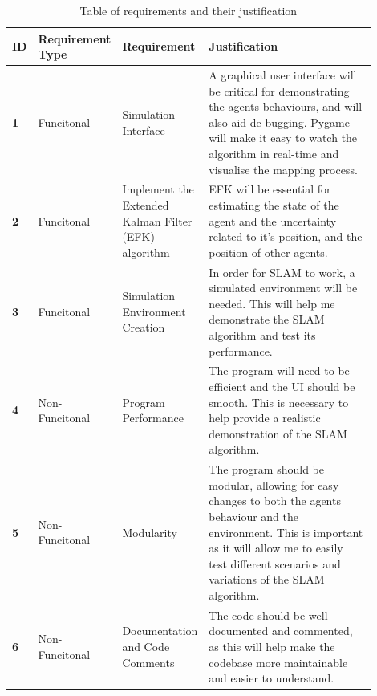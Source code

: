 \documentclass[12pt]{article}
\begin{document}
\begin{table}[H]
    \centering
    \begin{tabular}{|p{0.03\linewidth}|p{0.17\linewidth}|p{0.17\linewidth}|p{0.53\linewidth}|}
        \hline
        \textbf{ID} &
        \textbf{Requirement Type} &
        \textbf{Requirement} &
        \textbf{Justification}\\
        \hline
        \textbf{1} &
        Funcitonal &
        Simulation Interface &
        A graphical user interface will be critical for demonstrating the agents behaviours, and will also aid de-bugging. Pygame
        will make it easy to watch the algorithm in real-time and visualise the mapping process.\\
        \hline
        \textbf{2} &
        Funcitonal &
        Implement the Extended Kalman Filter (EFK) algorithm &
        EFK will be essential for estimating the state of the agent and the uncertainty related to it's position, and the position
        of other agents.\\
        \hline
        \textbf{3} &
        Funcitonal &
        Simulation Environment Creation &
        In order for SLAM to work, a simulated environment will be needed. This will help me demonstrate the SLAM algorithm and
        test its performance. \\
        \hline
        \textbf{4} &
        Non-Funcitonal &
        Program Performance &
        The program will need to be efficient and the UI should be smooth. This is necessary to help provide a realistic demonstration
        of the SLAM algorithm.\\
        \hline
        \textbf{5} &
        Non-Funcitonal &
        Modularity &
        The program should be modular, allowing for easy changes to both the agents behaviour and the environment. This is important
        as it will allow me to easily test different scenarios and variations of the SLAM algorithm.\\
        \hline
        \textbf{6} &
        Non-Funcitonal &
        Documentation and Code Comments &
        The code should be well documented and commented, as this will help make the codebase more maintainable and easier to
        understand.\\
        \hline
    \end{tabular}
    \caption{Table of requirements and their justification}\label{tab:requirements_table}
\end{table}\\
\end{document}
